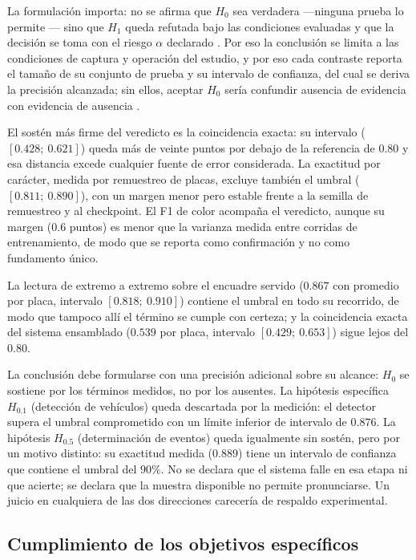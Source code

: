 La formulación importa: no se afirma que $H_0$ sea verdadera ---ninguna prueba lo
permite \cite{fisher1935design}--- sino que $H_1$ queda refutada bajo las
condiciones evaluadas \cite{popper1959logic} y que la decisión se toma con el
riesgo $\alpha$ declarado \cite{neyman1933problem}. Por eso la conclusión se
limita a las condiciones de captura y operación del estudio, y por eso cada
contraste reporta el tamaño de su conjunto de prueba y su intervalo de confianza,
del cual se deriva la precisión alcanzada; sin ellos, aceptar $H_0$
sería confundir ausencia de evidencia con evidencia de ausencia
\cite{altman1995absence}.

El sostén más firme del veredicto es la coincidencia exacta: su intervalo
($[0{.}428;\ 0{.}621]$) queda más de veinte puntos por debajo de la referencia de
$0{.}80$ y esa distancia excede cualquier fuente de error considerada. La
exactitud por carácter, medida por remuestreo de placas, excluye también el umbral
($[0{.}811;\ 0{.}890]$), con un margen menor pero estable frente a la semilla de
remuestreo y al checkpoint. El F1 de color acompaña el veredicto, aunque su margen
($0{.}6$ puntos) es menor que la varianza medida entre corridas de entrenamiento,
de modo que se reporta como confirmación y no como fundamento único.

La lectura de extremo a extremo sobre el encuadre servido ($0{.}867$ con promedio
por placa, intervalo $[0{.}818;\ 0{.}910]$) contiene el umbral en todo su
recorrido, de modo que tampoco allí el término se cumple con certeza; y la
coincidencia exacta del sistema ensamblado ($0{.}539$ por placa, intervalo
$[0{.}429;\ 0{.}653]$) sigue lejos del $0{.}80$.

La conclusión debe formularse con una precisión adicional sobre su alcance:
$H_0$ se sostiene por los términos medidos, no por los ausentes. La hipótesis
específica $H_{0{.}1}$ (detección de vehículos) queda descartada por la medición: el
detector supera el umbral comprometido con un límite inferior de intervalo de
$0{.}876$. La hipótesis $H_{0{.}5}$ (determinación de eventos) queda igualmente sin
sostén, pero por un motivo distinto: su exactitud medida ($0{.}889$) tiene un
intervalo de confianza que contiene el umbral del $90\%$. No se declara que el
sistema falle en esa etapa ni que acierte; se declara que la muestra disponible no
permite pronunciarse. Un juicio en cualquiera de las dos direcciones carecería de
respaldo experimental.

\subsection{Cumplimiento de los objetivos específicos}

